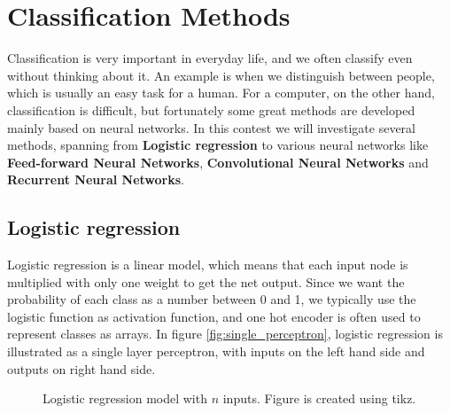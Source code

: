 \section{Classification Methods} \label{sec:methods}
Classification is very important in everyday life, and we often classify even without thinking about it. An example is when we distinguish between people, which is usually an easy task for a human. For a computer, on the other hand, classification is difficult, but fortunately some great methods are developed mainly based on neural networks. In this contest we will investigate several methods, spanning from \textbf{Logistic regression} to various neural networks like \textbf{Feed-forward Neural Networks}, \textbf{Convolutional Neural Networks} and \textbf{Recurrent Neural Networks}. 

\subsection{Logistic regression}
Logistic regression is a linear model, which means that each input node is multiplied with only one weight to get the net output. Since we want the probability of each class as a number between 0 and 1, we typically use the logistic function as activation function, and one hot encoder is often used to represent classes as arrays. In figure \eqref{fig:single_perceptron}, logistic regression is illustrated as a single layer perceptron, with inputs on the left hand side and outputs on right hand side. 

\begin{figure} [H]
	\centering
	\caption{Logistic regression model with $n$ inputs. Figure is created using tikz. \cite{tikz}}
	\label{fig:single_perceptron}
\end{figure}

